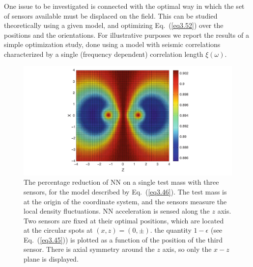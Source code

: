 One issue to be investigated is connected with the optimal way in which the set of sensors available must be displaced on the field. This can be studied theoretically using a given model, and optimizing Eq.~(\ref{eq3.52}) over the positions and the orientations. For illustrative purposes we report the results of a simple optimization study, done using a model with seismic correlations characterized by a single (frequency dependent) 
correlation length $\xi(\omega)$. 
\begin{figure}[t]
	\begin{center}
		\includegraphics[width=16.5cm]{./Sec_SiteInfra/Figures/SimplOptSens.pdf}
		\end{center}
		\caption{The percentage reduction of NN on a single test mass with three sensors, for the model described by Eq.~(\ref{eq3.46}). The test mass is at the origin of the coordinate system, and the sensors measure the local density fluctuations. NN acceleration is sensed along the $z$ axis. Two sensors are fixed at their optimal positions, which are located at the circular spots at $(x,z)=(0,\pm)$. the quantity $1-\epsilon$ (see Eq.~(\ref{eq3.45})) is plotted as a function of the position of the third sensor. There is axial symmetry around the $z$ axis, so only the $x-z$ plane is displayed.}
\label{fig:NNreduction}
\end{figure}

